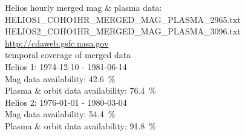 Helios hourly merged mag \& plasma data:\\
HELIOS1\_COHO1HR\_MERGED\_MAG\_PLASMA\_2965.txt\\
HELIOS2\_COHO1HR\_MERGED\_MAG\_PLASMA\_3096.txt\\
\url{http://cdaweb.gsfc.nasa.gov}\\
temporal coverage of merged data\\
Helios 1: 1974-12-10 - 1981-06-14\\
Mag data availability: 42.6~\%\\
Plasma \& orbit data availability: 76.4~\%\\
Helios 2: 1976-01-01 - 1980-03-04\\
Mag data availability: 54.4~\%\\
Plasma \& orbit data availability: 91.8~\%\\

